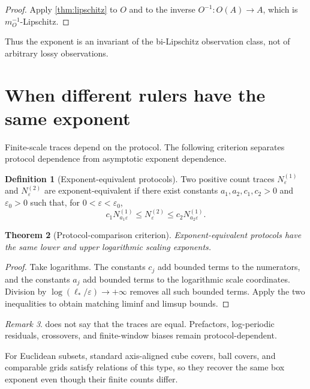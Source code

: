 \documentclass[11pt,a4paper]{article}
\theoremstyle{definition}
\newtheorem{definition}{Definition}[section]
\theoremstyle{plain}
\newtheorem{theorem}[definition]{Theorem}
\theoremstyle{remark}
\newtheorem{remark}[definition]{Remark}
\begin{document}
\begin{proof}
Apply \cref{thm:lipschitz} to $O$ and to the inverse
$O^{-1}:O(A)\to A$, which is $m_O^{-1}$-Lipschitz.
\end{proof}

Thus the exponent is an invariant of the bi-Lipschitz observation class,
not of arbitrary lossy observations.

\section{When different rulers have the same exponent}

Finite-scale traces depend on the protocol. The following criterion
separates protocol dependence from asymptotic exponent dependence.

\begin{definition}[Exponent-equivalent protocols]
Two positive count traces $N_\varepsilon^{(1)}$ and
$N_\varepsilon^{(2)}$ are exponent-equivalent if there exist constants
$a_1,a_2,c_1,c_2>0$ and $\varepsilon_0>0$ such that, for
$0<\varepsilon<\varepsilon_0$,
\[
c_1N_{a_1\varepsilon}^{(1)}
\leq
N_{\varepsilon}^{(2)}
\leq
c_2N_{a_2\varepsilon}^{(1)}.
\]
\end{definition}

\begin{theorem}[Protocol-comparison criterion]
\label{thm:protocol}
Exponent-equivalent protocols have the same lower and upper logarithmic
scaling exponents.
\end{theorem}

\begin{proof}
Take logarithms. The constants $c_j$ add bounded terms to the numerators,
and the constants $a_j$ add bounded terms to the logarithmic scale
coordinates. Division by
$\log(\ell_*/\varepsilon)\to+\infty$ removes all such bounded terms.
Apply the two inequalities to obtain matching liminf and limsup bounds.
\end{proof}

\begin{remark}
 does not say that the traces are equal. Prefactors,
log-periodic residuals, crossovers, and finite-window biases remain
protocol-dependent.
\end{remark}

For Euclidean subsets, standard axis-aligned cube covers, ball covers,
and comparable grids satisfy relations of this type, so they recover the
same box exponent even though their finite counts differ.
\end{document}
